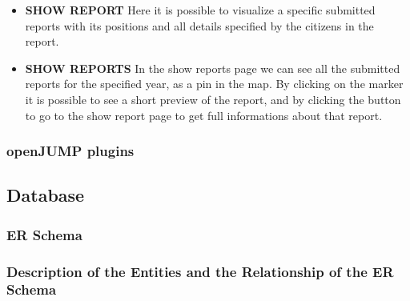 \begin{itemize}
    \item \textbf{SHOW REPORT}
    Here it is possible to visualize a specific submitted reports with its positions and all details specified by the citizens in the report.

    \item \textbf{SHOW REPORTS}
    In the show reports page we can see all the submitted reports for the specified year, as a pin in the map. By clicking on the marker it is possible to see a short preview of the report, and by clicking the button to go to the show report page to get full informations about that report.
\end{itemize}

 \subsubsection{openJUMP plugins}

 \subsection{Database}
 \subsubsection{ER Schema}
 \subsubsection{Description of the Entities and the Relationship of the ER Schema}